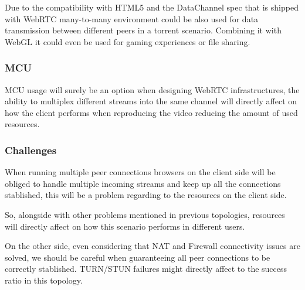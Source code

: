 Due to the compatibility with HTML5 and the DataChannel spec that is shipped with WebRTC many-to-many environment could be also used for data transmission between different peers in a torrent scenario. Combining it with WebGL it could even be used for gaming experiences or file sharing.

\subsubsection{MCU}

MCU usage will surely be an option when designing WebRTC infrastructures, the ability to multiplex different streams into the same channel will directly affect on how the client performs when reproducing the video reducing the amount of used resources. 

\subsubsection{Challenges}

When running multiple peer connections browsers on the client side will be obliged to handle multiple incoming streams and keep up all the connections stablished, this will be a problem regarding to the resources on the client side. 

So, alongside with other problems mentioned in previous topologies, resources will directly affect on how this scenario performs in different users. 

On the other side, even considering that NAT and Firewall connectivity issues are solved, we should be careful when guaranteeing all peer connections to be correctly stablished. TURN/STUN failures might directly affect to the success ratio in this topology.

